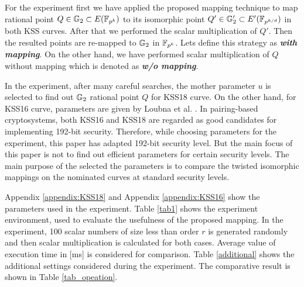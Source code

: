 For the experiment first we have applied the proposed mapping technique to map rational point $Q \in {\mathbb{G}}_{2} \subset E({\mathbb{F}}_{p^{k}})$ to its isomorphic point $Q' \in {\mathbb{G}}_{2}' \subset E'(\mathbb{F}_{p^{k/d}})$ in both KSS curves. After that we performed the scalar multiplication of $Q'$. Then the resulted points are re-mapped to ${\mathbb{G}}_{2}$ in $\mathbb{F}_{p^k}$. Lets define this strategy as \textit{\textbf{with mapping}}.
On the other hand, we have performed scalar multiplication of $Q$ without mapping which is denoted as \textit{\textbf{w/o mapping}}.

In the experiment, after many careful searches, the mother parameter $u$ is selected to find out ${\mathbb{G}}_{2}$ rational point $Q$ for KSS18 curve. On the other hand, for KSS16 curve, parameters are given by Loubna et al. \cite{kss_lub}.
In pairing-based cryptosystems, both KSS16 and KSS18 are regarded as good candidates for implementing 192-bit security.
Therefore, while choosing parameters for the experiment, this paper has adapted 192-bit security level. 
But the main focus of this paper is not to find out efficient parameters for certain security levels. 
The main purpose of the selected the parameters is to compare the twisted isomorphic mappings on the nominated curves at standard security levels. 

Appendix \ref{appendix:KSS18} and Appendix \ref{appendix:KSS16} show the parameters used in the experiment. Table \ref{tab1} shows the experiment environment, used to evaluate the usefulness of the proposed mapping.  
In the experiment, 100 scalar numbers of size less than order $r$ is generated randomly and then scalar multiplication is calculated for both cases. Average value of execution time in [ms] is considered for comparison. Table \ref{additional} shows the additional  settings considered during the experiment. The comparative result is shown in Table \ref{tab_opeation}.

\renewcommand{\baselinestretch}{1.5}
\begin{table*}
\centering
\caption{ Computational Environment}
\label{tab1}
\end{table*}
\renewcommand{\baselinestretch}{1.0}

